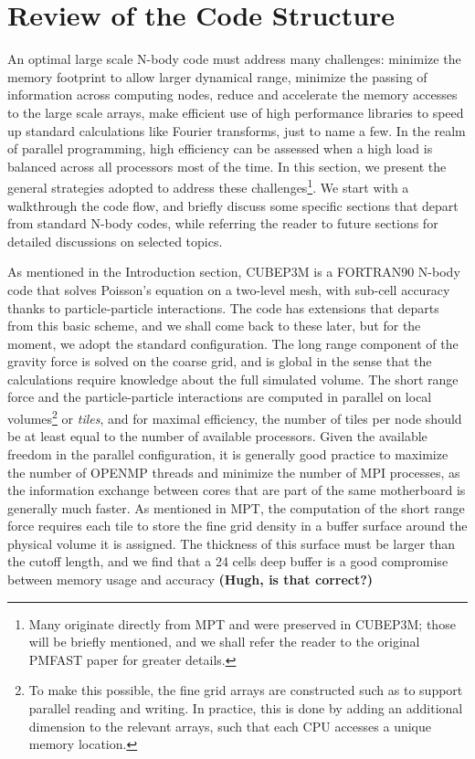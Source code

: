 
\section{Review of the Code Structure}
\label{sec:structure}


An optimal large scale N-body code must address many challenges: minimize the memory footprint to allow larger dynamical range,
minimize the passing of information across computing nodes, reduce and accelerate the memory accesses to the large scale arrays, 
make efficient use of high performance libraries to speed up standard calculations like Fourier transforms, just to name a few.
In the realm of parallel programming, high efficiency  can be assessed when a high load is balanced across all processors
most of the time. In this section, we present the general strategies adopted to address these challenges\footnote{ 
Many originate directly from MPT and were preserved in {\small CUBEP3M};
those will be briefly mentioned, and we shall refer the reader to the original PMFAST paper for greater details.}.
We start with a walkthrough the code flow, and briefly discuss some specific sections that depart from standard N-body codes,
while referring the reader to future sections for detailed discussions on selected topics.


As mentioned in the Introduction section, {\small CUBEP3M} is a {\small FORTRAN90} 
N-body code that solves Poisson's equation on a two-level mesh, 
with sub-cell accuracy thanks to particle-particle interactions. 
The code has extensions that departs from this basic scheme, and
we shall come back to these later, but for the moment, we adopt the 
standard configuration. 
The long range component of the gravity force is solved on the coarse grid, 
and is global in the sense that the calculations require knowledge about the full simulated volume.
The short range force and the particle-particle interactions are computed in parallel on local volumes\footnote{To make this possible, the fine grid arrays are constructed such as to support parallel reading and writing. In practice, this is done by adding an additional dimension to the relevant arrays, such that each {\small CPU} accesses a unique memory location.} or {\it tiles},
and for maximal efficiency, the number of tiles per node should be at least equal to the number of available processors.
Given the available freedom in the parallel configuration, it is generally good practice to maximize the number of {\small OPENMP} threads and minimize the number of {\small MPI} processes, as the information exchange between cores that are part of the same motherboard is generally much faster.
As mentioned in MPT, the computation of the short range force requires each tile to store the fine grid density in a buffer surface around the physical volume it is assigned. The thickness of this surface must be larger than the cutoff length, and we find that a 24 cells deep buffer
is a good compromise between memory usage and accuracy {\bf (Hugh, is that correct?)}
 

